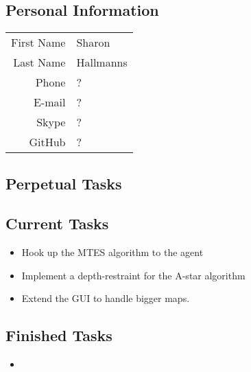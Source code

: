 \subsection{Personal Information}
\begin{table}[h!]
	\begin{tabular}{rl}
	First Name 	& Sharon\\
	Last Name	& Hallmanns\\
	Phone		& ?\\
	E-mail		& ?\\
	Skype		& ?\\
	GitHub		& ?
\end{tabular}
\end{table}

\subsection{Perpetual Tasks}

\subsection{Current Tasks}
\begin{itemize}
	\item Hook up the MTES algorithm to the agent
	\item Implement a depth-restraint for the A-star algorithm
	\item Extend the GUI to handle bigger maps.
\end{itemize}

\subsection{Finished Tasks}
\begin{itemize}
	\item
\end{itemize}